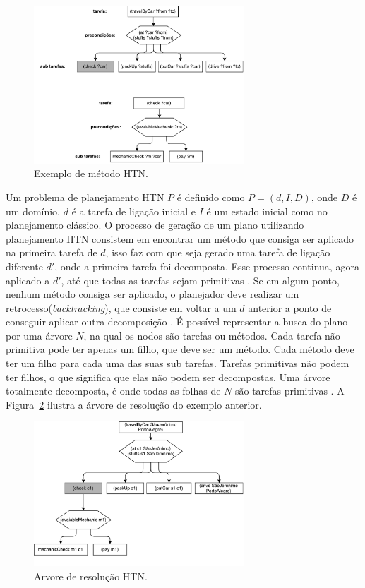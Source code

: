 \begin{figure}[ht]
	\centering
	\includegraphics[width=0.7\textwidth]{fig/htnmethod.pdf}
	\caption{Exemplo de método HTN.}
	\label{fig:htnmethod}
\end{figure} 

Um problema de planejamento HTN $P$ é definido como $P = (d, I, D)$, onde $D$ é um domínio, $d$ é a tarefa de ligação inicial e $I$ é um estado inicial como no planejamento clássico. 
O processo de geração de um plano utilizando planejamento HTN consistem em encontrar um método que consiga ser aplicado na primeira tarefa de $d$, isso faz com que seja gerado uma tarefa de ligação diferente $d'$, onde a primeira tarefa foi decomposta. 
Esse processo continua, agora aplicado a $d'$, até que todas as tarefas sejam primitivas \cite{meneguzzi2015planning}. 
Se em algum ponto, nenhum método consiga ser aplicado, o planejador deve realizar um retrocesso(\textit{backtracking}), que consiste em voltar a um $d$ anterior a ponto de conseguir aplicar outra decomposição \cite{intelligence2003modern}. 
É possível representar a busca do plano por uma árvore $N$, na qual os nodos são tarefas ou métodos. 
Cada tarefa não-primitiva pode ter apenas um filho, que deve ser um método. 
Cada método deve ter um filho para cada uma das suas sub tarefas. 
Tarefas primitivas não podem ter filhos, o que significa que elas não podem ser decompostas. 
Uma árvore totalmente decomposta, é onde todas as folhas de $N$ são tarefas primitivas \cite{ontanon2015adversarial}. 
A Figura~\ref{fig:htnmethodtree} ilustra a árvore de resolução do exemplo anterior.

\begin{figure}[ht]
	\centering
	\includegraphics[width=0.7\textwidth]{fig/htnmethodresult.pdf}
	\caption{Arvore de resolução HTN.}
	\label{fig:htnmethodtree}
\end{figure}

